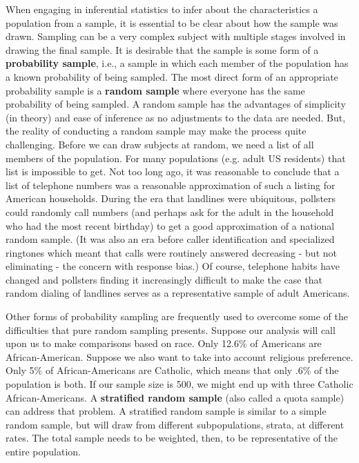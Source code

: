 \documentclass[11pt,openany]{book}\usepackage[]{graphicx}\usepackage[]{color}
\begin{document}
{When engaging in inferential statistics to infer about the characteristics a population from a sample, it is essential to be clear about how the sample was drawn. Sampling can be a very complex subject with multiple stages involved in drawing the final sample. It is desirable that the sample is some form of a \textbf{probability sample}, i.e., a sample in which each member of the population has a known probability of being sampled.   The most direct form of an appropriate probability sample is a \textbf{random sample} where everyone has the same probability of being sampled.  A random sample has the advantages of simplicity (in theory) and ease of inference as no adjustments to the data are needed.  But, the reality of conducting a random sample may make the process quite challenging.  Before we can draw subjects at random, we need a list of all members of the population.  For many populations (e.g. adult US residents) that list is impossible to get.  Not too long ago, it was reasonable to conclude that a list of telephone numbers was a reasonable approximation of such a listing for American households.  During the era that landlines were ubiquitous, pollsters could randomly call numbers (and perhaps ask for the adult in the household who had the most recent birthday) to get a good approximation of a national random sample.  (It was also an era before caller identification and specialized ringtones which meant that calls were routinely answered decreasing - but not eliminating - the concern with response bias.)  Of course, telephone habits have changed and pollsters finding it increasingly difficult to make the case that random dialing of landlines serves as a representative sample of adult Americans.

Other forms of probability sampling are frequently used to overcome some of the difficulties that pure random sampling presents.  Suppose our analysis will call upon us to make comparisons based on race.  Only 12.6\% of Americans are African-American.  Suppose we also want to take into account religious preference.  Only 5\% of African-Americans are Catholic, which means that only .6\% of the population is both.  If our sample size is 500, we might end up with three Catholic African-Americans.  A \textbf{stratified random sample} (also called a quota sample) can address that problem.  A stratified random sample is similar to a simple random sample, but will draw from different subpopulations, strata, at different rates.  The total sample needs to be weighted, then, to be representative of the entire population.
  
}
\end{document}
